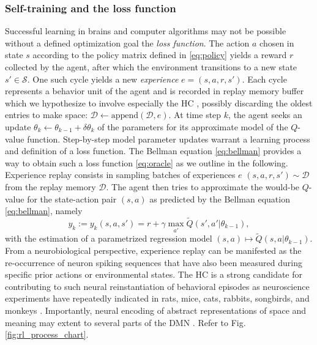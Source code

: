 \documentclass[10pt,letterpaper]{article}
\begin{document}
  \subsubsection{Self-training and the loss function}
  \label{sec:self}
Successful learning in brains and computer algorithms may not be possible without a
defined optimization goal \textemdash the \textit{loss function}.
The action $a$ chosen in state $s$ according to the policy matrix defined in
\eqref{eq:policy} yields a reward $r$ collected by the agent,
after which the environment transitions to a new state $s' \in \mathcal S$.
One such cycle yields a new \textit{experience} $e = (s,a,r,s')$.
Each cycle represents a behavior unit of the agent
and is recorded in replay memory buffer \textemdash
which we hypothesize to involve especially the
HC \textemdash, possibly discarding the oldest entries to make space:
$\mathcal D \leftarrow \text{append}(\mathcal D, e)$.
At time step $k$, the agent seeks an update $\theta_{k} \leftarrow \theta_{k-1}
+ \delta \theta_{k}$ of the parameters for its approximate model of the
$Q$-value function. Step-by-step model parameter updates warrant a learning process and definition of a loss
function. %
The Bellman equation \eqref{eq:bellman} provides a way to obtain such a loss
function \eqref{eq:oracle} as we outline in the following.
Experience replay consists in sampling
batches of experiences $e$
$(s, a, r, s') \sim \mathcal D$ from the replay memory $\mathcal D$.
The agent then tries to approximate
the would-be $Q$-value for the state-action pair $(s,a)$ as predicted by the
Bellman equation \eqref{eq:bellman}, namely
\begin{equation}
  y_k := y_k(s,a,s') =  r + \gamma \max_{a'} \tilde{Q}(s', a'|\theta_{k-1}),
\end{equation}
with the estimation of a parametrized regression model $(s,a)
\mapsto \tilde{Q}(s, a|\theta_{k-1})$.
From a neurobiological perspective, experience replay can be manifested as the
re-occurrence of neuron spiking sequences that have also been measured during
specific prior actions or environmental states. The HC is a strong candidate
for contributing to such neural reinstantiation of behavioral episodes as
neuroscience experiments have repeatedly indicated in rats, mice, cats, rabbits,
songbirds, and monkeys \citep{buhry2011,nokia2010,dave2000,skaggs2007}.
Importantly, neural encoding of abstract representations of space and meaning 
may extent to several parts of the DMN \citep{behrens_grid}.
Refer to
Fig. \ref{fig:rl_process_chart}.
\end{document}
